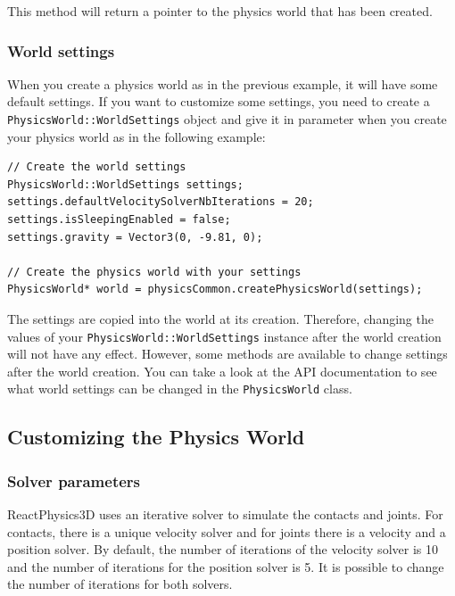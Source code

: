 \documentclass[a4paper,12pt]{article}
\begin{document}
    \vspace{0.6cm}

    This method will return a pointer to the physics world that has been created.

    \subsubsection{World settings}

    \begin{sloppypar}
    When you create a physics world as in the previous example, it will have some default settings. If you want to customize some settings, you need to
    create a \texttt{PhysicsWorld::WorldSettings} object and give it in parameter when you create your physics world as in the following example: \\
    \end{sloppypar}

    \begin{lstlisting}
// Create the world settings
PhysicsWorld::WorldSettings settings;
settings.defaultVelocitySolverNbIterations = 20;
settings.isSleepingEnabled = false;
settings.gravity = Vector3(0, -9.81, 0);

// Create the physics world with your settings
PhysicsWorld* world = physicsCommon.createPhysicsWorld(settings);
    \end{lstlisting}

    \vspace{0.6cm}

    The settings are copied into the world at its creation. Therefore, changing the values of your \texttt{PhysicsWorld::WorldSettings} instance after the
    world creation will not have any effect. However, some methods are available to change settings after the world creation. You can take a
    look at the API documentation to see what world settings can be changed in the \texttt{PhysicsWorld} class. \\

    \subsection{Customizing the Physics World}

    \subsubsection{Solver parameters}

    ReactPhysics3D uses an iterative solver to simulate the contacts and joints. For contacts, there is a unique velocity solver and for
    joints there is a velocity and a position solver. By default, the number of iterations of the velocity solver is 10 and the number of iterations
    for the position solver is 5. It is possible to change the number of iterations for both solvers. \\
\end{document}
